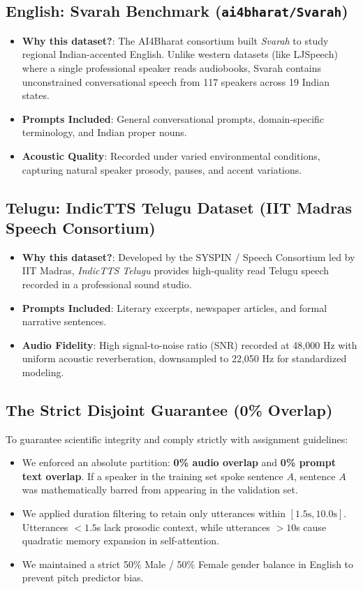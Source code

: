 \documentclass[11pt,a4paper]{article}
\begin{document}
\subsection{English: Svarah Benchmark (\texttt{ai4bharat/Svarah})}
\begin{itemize}
  \item \textbf{Why this dataset?}: The AI4Bharat consortium built \textit{Svarah} to study regional Indian-accented English. Unlike western datasets (like LJSpeech) where a single professional speaker reads audiobooks, Svarah contains unconstrained conversational speech from 117 speakers across 19 Indian states.
  \item \textbf{Prompts Included}: General conversational prompts, domain-specific terminology, and Indian proper nouns.
  \item \textbf{Acoustic Quality}: Recorded under varied environmental conditions, capturing natural speaker prosody, pauses, and accent variations.
\end{itemize}

\subsection{Telugu: IndicTTS Telugu Dataset (IIT Madras Speech Consortium)}
\begin{itemize}
  \item \textbf{Why this dataset?}: Developed by the SYSPIN / Speech Consortium led by IIT Madras, \textit{IndicTTS Telugu} provides high-quality read Telugu speech recorded in a professional sound studio.
  \item \textbf{Prompts Included}: Literary excerpts, newspaper articles, and formal narrative sentences.
  \item \textbf{Audio Fidelity}: High signal-to-noise ratio (SNR) recorded at 48,000 Hz with uniform acoustic reverberation, downsampled to 22,050 Hz for standardized modeling.
\end{itemize}

\subsection{The Strict Disjoint Guarantee (0\% Overlap)}
To guarantee scientific integrity and comply strictly with assignment guidelines:
\begin{itemize}
  \item We enforced an absolute partition: \textbf{0\% audio overlap} and \textbf{0\% prompt text overlap}. If a speaker in the training set spoke sentence $A$, sentence $A$ was mathematically barred from appearing in the validation set.
  \item We applied duration filtering to retain only utterances within $[1.5\text{s}, 10.0\text{s}]$. Utterances $<1.5$s lack prosodic context, while utterances $>10$s cause quadratic memory expansion in self-attention.
  \item We maintained a strict 50\% Male / 50\% Female gender balance in English to prevent pitch predictor bias.
\end{itemize}
\end{document}
